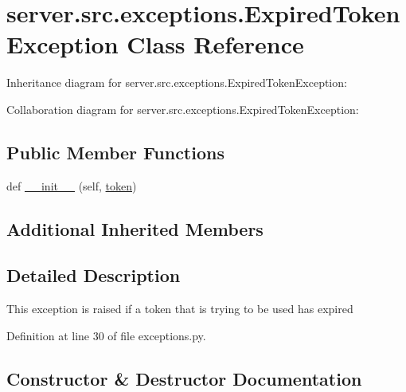 \hypertarget{classserver_1_1src_1_1exceptions_1_1_expired_token_exception}{}\section{server.\+src.\+exceptions.\+Expired\+Token\+Exception Class Reference}
\label{classserver_1_1src_1_1exceptions_1_1_expired_token_exception}


Inheritance diagram for server.\+src.\+exceptions.\+Expired\+Token\+Exception\+:


Collaboration diagram for server.\+src.\+exceptions.\+Expired\+Token\+Exception\+:
\subsection*{Public Member Functions}
\begin{DoxyCompactItemize}
\item 
def \hyperlink{classserver_1_1src_1_1exceptions_1_1_expired_token_exception_a09f220a07aebdf5a4d64cfe5cd9ffe06}{\+\_\+\+\_\+init\+\_\+\+\_\+} (self, \hyperlink{classserver_1_1src_1_1exceptions_1_1_invalid_token_exception_a55c9f26dd8ec500cd9f49be460f45379}{token})
\end{DoxyCompactItemize}
\subsection*{Additional Inherited Members}


\subsection{Detailed Description}
\begin{DoxyVerb}This exception is raised if a token that is trying to be used has expired\end{DoxyVerb}
 

Definition at line 30 of file exceptions.\+py.



\subsection{Constructor \& Destructor Documentation}
